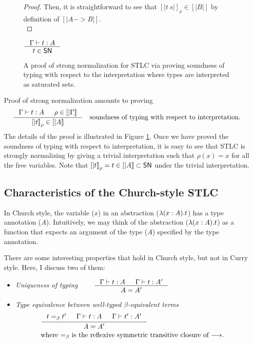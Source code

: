 \begin{figure}
\begin{proof}
Then, it is straightforward to see that $[|t~s|]_\rho\in[|B|]$
by definition of $[|A -> B|]$.\\
\end{proof}
\begin{corollary}
	$\inference{\Gamma |- t : A}{t \in \SN}$
\end{corollary}
\begin{singlespace}
\caption[Strong normalization proof for STLC]{
	A proof of strong normalization for STLC via proving
	soundness of typing with respect to the interpretation
        where types are interpreted as saturated sets.}
\label{fig:SNproofSTLC}
\end{singlespace}
\end{figure}

Proof of strong normalization amounts to proving
\[ \inference{\Gamma|- t:A & \rho \in [|\Gamma|]}{[|t|]_\rho \in [|A|]}
\quad \text{soundness of typing with respect to interpretation.}
\]
The details of the proof is illustrated in Figure \ref{fig:SNproofSTLC}.
Once we have proved the soundness of typing with respect to interpretation,
it is easy to see that STLC is strongly normalizing by giving a trivial
interpretation such that $\rho(x) = x$ for all the free variables. Note that
$[|t|]_\rho = t \in [|A|] \subset \mathsf{SN}$ under the trivial interpretation.

\subsection{Characteristics of the Church-style STLC}\label{sec:stlc:church}
In Church style, the variable ($x$) in an abstraction
($\lambda(x:A).t$) has a type annotation ($A$). Intuitively, we may think of
the abstraction ($\lambda(x:A).t$) as a function that expects an argument of
the type ($A$) specified by the type annotation.

There are some interesting properties that hold in Church style,
but not in Curry style. Here, I discuss two of them:
\begin{itemize}
\item \emph{Uniqueness of typing}
$\qquad\inference{\Gamma |- t : A & \Gamma |- t : A'}{A = A'} $

\item \emph{Type equivalence between well-typed $\beta$-equivalent terms}
\begin{align*}
& \inference{t =_{\beta} t' & \Gamma |- t : A & \Gamma |- t' : A'}{A = A'} \\
& \text{where $=_{\beta}$ is the reflexive symmetric transitive closure of $-->$.}
\end{align*}
\end{itemize}

